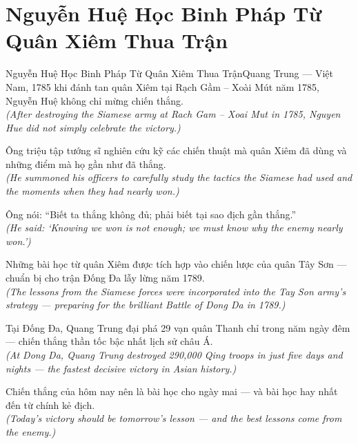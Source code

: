 \section{Nguyễn Huệ Học Binh Pháp Từ Quân Xiêm Thua Trận}
\begin{truyen}{Nguyễn Huệ Học Binh Pháp Từ Quân Xiêm Thua Trận}{Quang Trung --- Việt Nam, 1785}
 khi đánh tan quân Xiêm tại Rạch Gầm -- Xoài Mút năm 1785, Nguyễn Huệ không chỉ mừng chiến thắng.\\[4pt]
\textit{(After destroying the Siamese army at Rach Gam -- Xoai Mut in 1785, Nguyen Hue did not simply celebrate the victory.)}

Ông triệu tập tướng sĩ nghiên cứu kỹ các chiến thuật mà quân Xiêm đã dùng và những điểm mà họ gần như đã thắng.\\[4pt]
\textit{(He summoned his officers to carefully study the tactics the Siamese had used and the moments when they had nearly won.)}

Ông nói: ``Biết ta thắng không đủ; phải biết tại sao địch gần thắng.''\\[4pt]
\textit{(He said: `Knowing we won is not enough; we must know why the enemy nearly won.')}

Những bài học từ quân Xiêm được tích hợp vào chiến lược của quân Tây Sơn --- chuẩn bị cho trận Đống Đa lẫy lừng năm 1789.\\[4pt]
\textit{(The lessons from the Siamese forces were incorporated into the Tay Son army's strategy --- preparing for the brilliant Battle of Dong Da in 1789.)}

Tại Đống Đa, Quang Trung đại phá 29 vạn quân Thanh chỉ trong năm ngày đêm --- chiến thắng thần tốc bậc nhất lịch sử châu Á.\\[4pt]
\textit{(At Dong Da, Quang Trung destroyed 290,000 Qing troops in just five days and nights --- the fastest decisive victory in Asian history.)}

\end{truyen}
\begin{baihoc}
  Chiến thắng của hôm nay nên là bài học cho ngày mai --- và bài học hay nhất đến từ chính kẻ địch.\\[4pt]
  \textit{(Today's victory should be tomorrow's lesson --- and the best lessons come from the enemy.)}
\end{baihoc}


